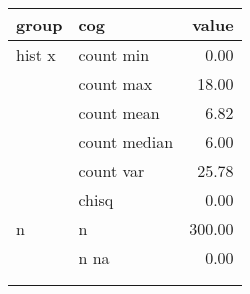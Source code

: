 \begin{tabular}{llr}
  \toprule
 group & cog & value \\ 
  \midrule
   hist x & count min & 0.00 \\ 
    & count max & 18.00 \\ 
    & count mean & 6.82 \\ 
    & count median & 6.00 \\ 
    & count var & 25.78 \\ 
  \bigskip  & chisq & 0.00 \\ 
   n & n & 300.00 \\ 
    & n na & 0.00 \\ 
    &  &  \\ 
    &  &  \\ 
   \bottomrule
\end{tabular}
